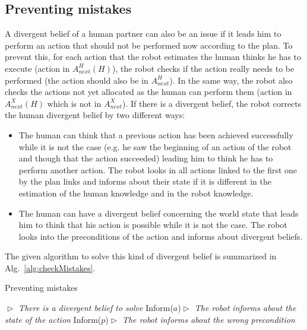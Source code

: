 \documentclass[english,a4paper,11pt,twoside]{StyleThese}
\begin{document}
\subsection{Preventing mistakes}

A divergent belief of a human partner can also be an issue if it leads him to perform an action that should not be performed now according to the plan. To prevent this, for each action that the robot estimates the human thinks he has to execute (action in $A^H_{next}(H)$), the robot checks if the action really needs to be performed (the action should also be in $A^H_{next}$). In the same way, the robot also checks the actions not yet allocated as the human can perform them (action in $A^X_{next}(H)$ which is not in $A^X_{next}$). If there is a divergent belief, the robot corrects the human divergent belief by two different ways:
\begin{itemize}
\item The human can think that a previous action has been achieved successfully while it is not the case (e.g. he saw the beginning of an action of the robot and though that the action succeeded) leading him to think he has to perform another action. The robot looks in all actions linked to the first one by the plan links and informs about their state if it is different in the estimation of the human knowledge and in the robot knowledge.
\item The human can have a divergent belief concerning the world state that leads him to think that his action is possible while it is not the case. The robot looks into the preconditions of the action and informs about divergent beliefs.
\end{itemize}
The given algorithm to solve this kind of divergent belief is summarized in Alg.~\ref{alg:checkMistakes}.


\begin{algorithm}
\caption{Preventing mistakes}
\label{alg:checkMistakes}
\begin{algorithmic}
\STATE \hfill \textit{$\vartriangleright$ There is a divergent belief to solve}
\STATE Inform($a$)\hfill \textit{$\vartriangleright$ The robot informs about the state of the action}
\ENDIF
{}
\STATE Inform($p$)\hfill \textit{$\vartriangleright$ The robot informs about the wrong precondition}
\ENDIF
\ENDIF
\end{algorithmic}
\end{algorithm} 
\end{document}
